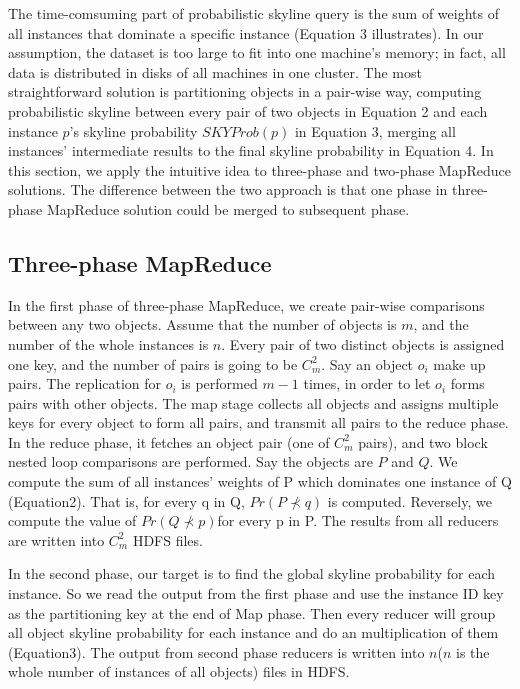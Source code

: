 The time-comsuming part of probabilistic skyline query is the sum of weights of all instances that dominate a specific instance (Equation 3 illustrates). In our assumption, the dataset is too large to fit into one machine's memory; in fact, all data is distributed in disks of all machines in one cluster. The most straightforward solution is partitioning objects in a pair-wise way, computing probabilistic skyline between every pair of two objects in Equation 2 and each instance \(p\)'s skyline probability \(SKYProb(p)\) in Equation 3, merging all instances' intermediate results to the final skyline probability in Equation 4. In this section, we apply the intuitive idea to three-phase and two-phase MapReduce solutions. The difference between the two approach is that one phase in three-phase MapReduce solution could be merged to subsequent phase.

\subsection{Three-phase MapReduce}
In the first phase of three-phase MapReduce, we create pair-wise comparisons between any two objects. Assume that the number of objects is \(m\), and the number of the whole instances is \(n\). Every pair of two distinct objects is assigned one key, and the number of pairs is going to be \(C_{m}^{2}\). Say an object $o_i$ make up pairs. The replication for $o_i$ is performed $m-1$ times, in order to let $o_i$ forms pairs with other objects. The map stage collects all objects and assigns multiple keys for every object to form all pairs, and transmit all pairs to the reduce phase.
In the reduce phase, it fetches an object pair (one of $C_{m}^{2}$ pairs), and two block nested loop comparisons are performed. Say the objects are \(P\) and \(Q\). We compute the sum of all instances' weights of P which dominates one instance of Q (Equation2). That is, for every q in Q, $Pr( P\nprec q) $ is computed. Reversely, we compute the value of $Pr( Q\nprec p) $for every p in P. The results from all reducers are written into \(C_{m}^{2}\) HDFS files.


In the second phase, our target is to find the global skyline probability for each instance. So we read the output from the first phase and use the instance ID key as the partitioning key at the end of Map phase. Then every reducer will group all object skyline probability for each instance and do an multiplication of them (Equation3). The output from second phase reducers is written into \(n\)(\(n\) is the whole number of instances of all objects) files in HDFS.

